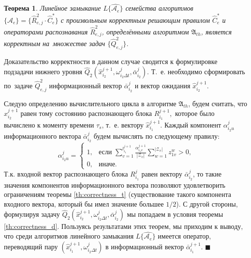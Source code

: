 \documentclass[a4paper, 12pt]{article}
\theoremstyle{plain}
\newtheorem{Theorem}{Теорема}
\newenvironment{Proof}%
	{\par\noindent{\bf Доказательство.}}%
	{\hfill$\scriptstyle\blacksquare$}
\begin{document}
	\begin{Theorem}
		Линейное замыкание $L\{\hat{\mathcal A_e}\}$ семейства алгоритмов $\{\hat{\mathcal A}_e\}=\{\hat R_{e,j}^2\cdot\hat C_e^*\}$ с произвольным корректным решающим правилом $\hat C_e^*$ и операторами распознавания $\hat R_{e,j}^2$, определёнными алгоритмом $\mathfrak A_{th}$, является корректным на~множестве задач $\{\hat Q_{e,j}^2\}$.
	\end{Theorem}
	
	\begin{Proof}
		Доказательство корректности в данном случае сводится к формулировке подзадачи нижнего уровня $\hat Q_2(\hat x_{i_2}^{j+1},\omega_{i_2\Delta t}^j,\bar\alpha_{i_2}^j)$. Т.~е. необходимо сформировать по~задаче $\hat Q_{e,j}^2$ информационный вектор $\bar\alpha_{i_2}^j$ и вектор ожидания $\hat x_{i_2}^{j+1}$.
		
		Следую определению вычислительного цикла в алгоритме $\mathfrak A_{th}$, будем считать, что $\hat x_{i_2}^{j+1}$ равен тому состоянию распознающего блока $R_{i_1}^{j+1}$,~которое было вычислено к моменту времени $\tau_s$, т.~е. вектору $\hat x_{i_1}^{j+1}$. Каждый компонент $\alpha_{i_2u}^j$ информационного вектора $\bar\alpha_{i_2}^j$ будем вычислять по следующему правилу:
		\[
			\alpha_{i_2u}^j=\begin{cases}
				1, & \text{если $\sum\limits_{v=1}^{l_{i_1}^{j+1}}\frac{\alpha_{i_1v}^{j+1}}{|\mathcal{Z}_v|}\sum\limits_{w=1}^{|\mathcal{Z}_v|}z_{1v}^w>0$,}\\
				
				0, & \text{иначе.}
			\end{cases}
		\]
		Т.к. входной вектор распознающего блока $R_{i_1}^j$ равен вектору $\bar\alpha_{i_2}^j$, то такие значения компонентов информационного вектора позволяют удовлетворить ограничениям теоремы \ref{th:correctness_t} (существование такого компонента входного вектора, который бы имел значение большее $1/2$). С другой стороны, формулируя задачу $\hat Q_2(\hat x_{i_2}^{j+1},\omega_{i_2\Delta t}^j,\bar\alpha_{i_2}^j)$ мы попадаем в условия теоремы \ref{th:correctness_d}. Пользуясь результатами этих теорем, мы приходим к выводу, что среди алгоритмов линейного замыкания $L\{\hat{\mathcal A_e}\}$ имеется оператор, переводящий пару $(\hat x_{i_1}^{j+1},\omega_{i_2\Delta t}^j)$ в информационный вектор $\bar\alpha_{i_1}^{j+1}$.
	\end{Proof}
	
\end{document}

